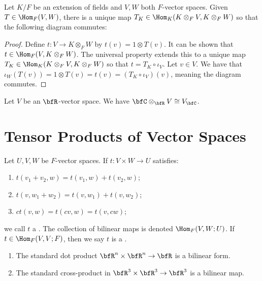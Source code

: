     \begin{theorem}
        Let $K/F$ be an extension of fields and $V,W$ both $F$-vector spaces. Given $T \in \Hom_F(V,W)$, there is a unique map $T_K \in \Hom_K(K \otimes_F V, K \otimes_F W)$ so that the following diagram commutes:
            \begin{center}
            \end{center}
    \end{theorem}
        \begin{proof}
            Define $t:V \rightarrow K \otimes_F W$ by $t(v) = 1 \otimes T(v)$. It can be shown that $t \in \Hom_F(V, K\otimes_F W)$. The universal property extends this to a unique map $T_K \in \Hom_K(K \otimes_F V, K\otimes_F W)$ so that $t = T_K \circ \iota_V$. Let $v \in V$. We have that $\iota_W(T(v)) = 1 \otimes T(v) = t(v) = (T_K \circ \iota_V)(v)$, meaning the diagram commutes.
        \end{proof}
    
    \begin{exercise}
        Let $V$ be an $\bfR$-vector space. We have $\bfC \otimes_\bfR V \cong V_\bfC$.
    \end{exercise}

\section{Tensor Products of Vector Spaces}
    \begin{definition}
        Let $U,V,W$ be $F$-vector spaces. If $t:V \times W \rightarrow U$ satisfies:
            \begin{enumerate}[label = (\arabic*)]
                \item ${t}\left(v_1+v_2, w\right)={t}\left(v_1, w\right)+{t}\left(v_2, w\right)$;
                \item ${t}\left(v, w_1+w_2\right)={t}\left(v, w_1\right)+{t}\left(v, w_2\right)$;
                \item ${ct}(v, w)={t}({c} v, w)={t}(v, {c} w)$;
            \end{enumerate}
        we call $t$ a . The collection of bilinear maps is denoted $\Hom_F(V,W;U)$. If $t \in \Hom_F(V,V;F)$, then we say $t$ is a .
    \end{definition}

    \begin{example}
        \phantom{a}
        \begin{enumerate}
            \item The standard dot product $\bfR^n \times \bfR^n \rightarrow \bfR$ is a bilinear form.
            \item The standard cross-product in $\bfR^3 \times \bfR^3 \rightarrow \bfR^3$ is a bilinear map.
        \end{enumerate}
    \end{example}